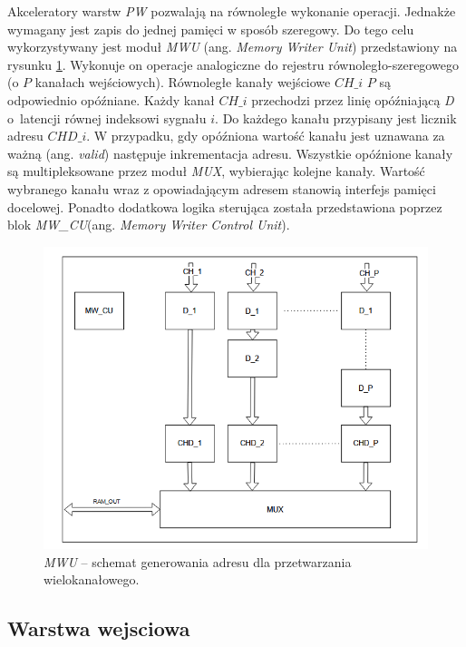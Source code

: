 Akceleratory warstw \emph{PW} pozwalają na równoległe wykonanie operacji.
Jednakże wymagany jest zapis do jednej pamięci w sposób szeregowy.
Do tego celu  wykorzystywany jest moduł \emph{MWU} (ang. \emph{Memory Writer Unit}) przedstawiony na rysunku \ref{fig:mwu}.
Wykonuje on operacje analogiczne do rejestru równoległo-szeregowego (o $P$ kanałach wejściowych).
Równoległe kanały wejściowe $CH\_i$ $P$ są odpowiednio opóźniane. 
Każdy kanał $CH\_{i}$ przechodzi przez linię opóźniającą \emph{D} o~latencji równej indeksowi sygnału $i$.
Do każdego kanału przypisany jest licznik adresu $CHD\_i$.
W przypadku, gdy opóźniona wartość kanału jest uznawana za ważną (ang. \emph{valid}) następuje inkrementacja adresu.
Wszystkie opóźnione kanały są multipleksowane przez moduł \emph{MUX}, wybierając kolejne kanały.
Wartość wybranego kanału wraz z opowiadającym adresem stanowią interfejs pamięci docelowej.
Ponadto dodatkowa logika sterująca została przedstawiona poprzez blok \emph{MW\_CU}(ang. \emph{Memory Writer Control Unit}).
\begin{figure}
    \centering
    \includegraphics[width=0.8\linewidth]{images/MWU.png}
    \caption{\emph{MWU} -- schemat generowania adresu dla przetwarzania wielokanałowego.}
    \label{fig:mwu}
\end{figure}

\subsection{Warstwa wejsciowa}

